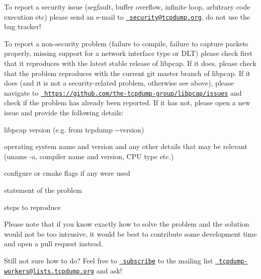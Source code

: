 To report a security issue (segfault, buffer overflow, infinite loop, arbitrary code execution etc) please send an e-\/mail to \href{mailto:security@tcpdump.org}{\texttt{ security@tcpdump.\+org}}, do not use the bug tracker!

To report a non-\/security problem (failure to compile, failure to capture packets properly, missing support for a network interface type or DLT) please check first that it reproduces with the latest stable release of libpcap. If it does, please check that the problem reproduces with the current git master branch of libpcap. If it does (and it is not a security-\/related problem, otherwise see above), please navigate to \href{https://github.com/the-tcpdump-group/libpcap/issues}{\texttt{ https\+://github.\+com/the-\/tcpdump-\/group/libpcap/issues}} and check if the problem has already been reported. If it has not, please open a new issue and provide the following details\+:


\begin{DoxyItemize}
\item libpcap version (e.\+g. from {\ttfamily tcpdump -\/-\/version})
\item operating system name and version and any other details that may be relevant ({\ttfamily uname -\/a}, compiler name and version, CPU type etc.)
\item {\ttfamily configure} or {\ttfamily cmake} flags if any were used
\item statement of the problem
\item steps to reproduce
\end{DoxyItemize}

Please note that if you know exactly how to solve the problem and the solution would not be too intrusive, it would be best to contribute some development time and open a pull request instead.

Still not sure how to do? Feel free to \href{https://www.tcpdump.org/\#mailing-lists}{\texttt{ subscribe}} to the mailing list \href{mailto:tcpdump-workers@lists.tcpdump.org}{\texttt{ tcpdump-\/workers@lists.\+tcpdump.\+org}} and ask! 